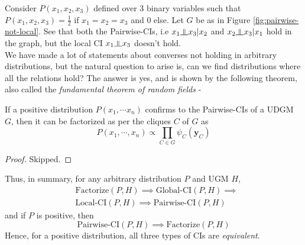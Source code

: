 Consider $P(x_1, x_2, x_3)$ defined over 3 binary variables such that $P(x_1,x_2,x_3) = \frac{1}{2}$ if $x_1=x_2=x_3$ and $0$ else. Let $G$ be as in Figure \ref{fig:pairwise-not-local}. See that both the Pairwise-CIs, i.e $x_1 \ind x_3 | x_2$ and $x_2 \ind x_3 | x_1$ hold in the graph, but the local CI $x_1 \ind x_3$ doesn't hold. \\
We have made a lot of statements about converses not holding in arbitrary distributions, but the natural question to arise is, can we find distributions where all the relations hold? The answer is yes, and is shown by the following theorem, also called the \textit{fundamental theorem of random fields} - 
\begin{thm}
If a positive distribution $P(x_1, \cdots x_n)$ confirms to the Pairwise-CIs of a UDGM $G$, then it can be factorized as per the cliques $C$ of $G$ as
\begin{equation}
	P(x_1, \cdots, x_n) \propto \prod_{C \in G} \psi_C(\mathbf{y}_C)
\end{equation}	
\end{thm}
\begin{proof}
Skipped.
\end{proof}
Thus, in summary, for any arbitrary distribution $P$ and UGM $H$,
\begin{equation}
	\begin{split}
	&\text{Factorize}(P, H) \implies \text{Global-CI}(P, H)\implies \\&\text{Local-CI}(P, H)\implies \text{Pairwise-CI}(P, H)
	\end{split}
\end{equation}
and if $P$ is positive, then
\begin{equation}
	\text{Pairwise-CI}(P, H) \implies \text{Factorize}(P, H)
\end{equation}
Hence, for a positive distribution, all three types of CIs are \textit{equivalent}.
